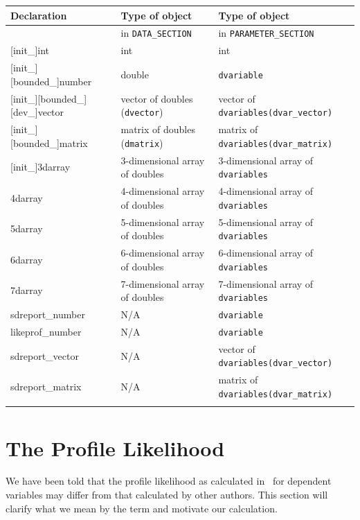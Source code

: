 \documentclass{admbmanual}
\newcommand\DS{\texttt{DATA\_SECTION}}
\newcommand\PS{\texttt{PARAMETER\_SECTION}}
\begin{document}
\begin{table}
\bgroup\footnotesize
\noindent\begin{tabular}{@{\vrule height 12pt depth 6pt width0pt}@{\tt} l @{\qquad} l @{\qquad}  l}
\\
\hline
{\bf Declaration} & {\bf Type of object} & {\bf Type of object} \\[2pt]
\hline
&in \DS & in \PS \\[1em]
{[}init\_]int & int & int \\
{[}init\_]{[}bounded\_]number & double & \texttt{dvariable} \\
{[}init\_]{[}bounded\_]{[}dev\_]vector&vector of doubles (\texttt{dvector}) & vector of \texttt{dvariables(dvar\_vector)} \\
{[}init\_]{[}bounded\_]matrix&matrix of doubles (\texttt{dmatrix}) & matrix of \texttt{dvariables(dvar\_matrix)} \\
{[}init\_]3darray&3-dimensional array of doubles & 3-dimensional array of \texttt{dvariables} \\
4darray&4-dimensional array of doubles & 4-dimensional array of \texttt{dvariables} \\
5darray&5-dimensional array of doubles & 5-dimensional array of \texttt{dvariables} \\
6darray&6-dimensional array of doubles & 6-dimensional array of \texttt{dvariables} \\
7darray&7-dimensional array of doubles & 7-dimensional array of \texttt{dvariables} \\
sdreport\_number & N/A &\texttt{dvariable} \\
likeprof\_number & N/A &\texttt{dvariable} \\
sdreport\_vector & N/A &vector of \texttt{dvariables(dvar\_vector)} \\
sdreport\_matrix & N/A &matrix of \texttt{dvariables(dvar\_matrix)} \\[3pt]
\hline
\\
\end{tabular}
\emptycaption
\label{tab:type-declarations}
\egroup
\end{table}


\chapter{The Profile Likelihood}

We have been told that the profile likelihood as calculated in \ADM\
for dependent variables may differ from that calculated by other authors.
This section will clarify what we mean by the term and motivate our
calculation.  
\end{document}
